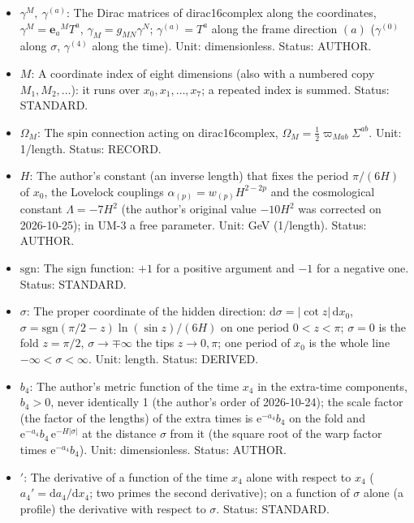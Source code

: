 \documentclass[
  10pt,
]{article}
\providecommand{\tightlist}{%
  \setlength{\itemsep}{0pt}\setlength{\parskip}{0pt}}
\begin{document}
\begin{itemize}
\tightlist
\item
  \(\gamma^M,\ \gamma^{(a)}\): The Dirac matrices of dirac16complex
  along the coordinates, \(\gamma^M = \mathbf{e}_a{}^MT^a\),
  \(\gamma_M = g_{MN}\gamma^N\); \(\gamma^{(a)} = T^a\) along the frame
  direction \((a)\) (\(\gamma^{(0)}\) along \(\sigma\), \(\gamma^{(4)}\)
  along the time). Unit: dimensionless. Status: AUTHOR.
\item
  \(M\): A coordinate index of eight dimensions (also with a numbered
  copy \(M_1, M_2, \dots\)): it runs over \(x_0, x_1, \dots, x_7\); a
  repeated index is summed. Status: STANDARD.
\item
  \(\Omega_M\): The spin connection acting on dirac16complex,
  \(\Omega_M = \frac12\varpi_{Mab}\Sigma^{ab}\). Unit: 1/length. Status:
  RECORD.
\item
  \(H\): The author's constant (an inverse length) that fixes the period
  \(\pi/(6H)\) of \(x_0\), the Lovelock couplings
  \(\alpha_{(p)} = w_{(p)}H^{2-2p}\) and the cosmological constant
  \(\Lambda = -7H^2\) (the author's original value \(-10H^2\) was
  corrected on 2026-10-25); in UM-3 a free parameter. Unit: GeV
  (1/length). Status: AUTHOR.
\item
  \(\mathrm{sgn}\): The sign function: \(+1\) for a positive argument
  and \(-1\) for a negative one. Status: STANDARD.
\item
  \(\sigma\): The proper coordinate of the hidden direction:
  \(\mathrm{d}\sigma = \lvert\cot z\rvert\,\mathrm{d}x_0\),
  \(\sigma = \mathrm{sgn}(\pi/2 - z)\ln(\sin z)/(6H)\) on one period
  \(0 < z < \pi\); \(\sigma = 0\) is the fold \(z = \pi/2\),
  \(\sigma \to \mp\infty\) the tips \(z \to 0, \pi\); one period of
  \(x_0\) is the whole line \(-\infty < \sigma < \infty\). Unit: length.
  Status: DERIVED.
\item
  \(b_4\): The author's metric function of the time \(x_4\) in the
  extra-time components, \(b_4 > 0\), never identically 1 (the author's
  order of 2026-10-24); the scale factor (the factor of the lengths) of
  the extra times is \(\mathrm{e}^{-a_4}b_4\) on the fold and
  \(\mathrm{e}^{-a_4}b_4\,\mathrm{e}^{-H\lvert\sigma\rvert}\) at the
  distance \(\sigma\) from it (the square root of the warp factor times
  \(\mathrm{e}^{-a_4}b_4\)). Unit: dimensionless. Status: AUTHOR.
\item
  \({}'\): The derivative of a function of the time \(x_4\) alone with
  respect to \(x_4\) (\(a_4' = \mathrm{d}a_4/\mathrm{d}x_4\); two primes
  the second derivative); on a function of \(\sigma\) alone (a profile)
  the derivative with respect to \(\sigma\). Status: STANDARD.
\end{itemize}
\end{document}
